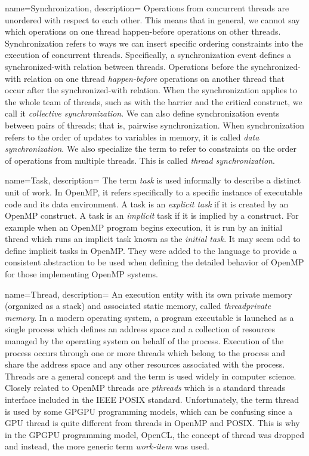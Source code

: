 {
   name={Synchronization},
   description={
   Operations from concurrent threads are unordered with respect to each other.  This means
   that in general, we cannot say which operations on one thread happen-before operations on 
   other threads.    Synchronization refers to ways we can insert specific ordering constraints
   into the execution of concurrent threads.  Specifically,
   a synchronization event defines a synchronized-with relation between threads.  Operations before the
   synchronized-with relation on one thread \emph{happen-before} operations on another thread that occur
   after the synchronized-with relation. When the synchronization applies to the whole team of threads, such as with 
   the barrier and the critical construct, we call it \emph{collective synchronization}.  We can also 
   define synchronization events between pairs of threads; that is, pairwise synchronization.  When synchronization
    refers to the order of updates to variables in memory, it is called \emph{data synchronization}.
   We also specialize the term to refer to constraints on the order of operations from multiple threads.  This is
   called \emph{thread synchronization}.   
}
}   


{
   name={Task},
   description={
   The term \emph{task} is used informally to describe a distinct unit of work.  In OpenMP, it refers 
   specifically to a specific instance of executable code and its data environment.  A task is an
   \emph{explicit task} if it is created by an OpenMP  construct.  A task is an \emph{implicit}
   task if it is implied by a construct.  For example when an OpenMP program begins execution, it is run
   by an initial thread which runs an implicit task known as the \emph{initial task}.   It may seem odd to 
   define implicit tasks in OpenMP.  They were added to the language to provide a consistent abstraction
   to be used when defining the detailed behavior of OpenMP for those implementing OpenMP systems.
   }
}   

{
   name={Thread},
   description={ 
An execution entity with its own private memory (organized as a stack) and associated static 
memory, called \emph{threadprivate memory}.  In a modern operating system, a program
executable is launched as a single process which defines an address space and a 
collection of resources managed by the operating system on behalf of the process.
Execution of the process occurs through one or more threads which belong to the
process and share the address space and any other resources associated with the process.
Threads are a general concept and the term is used widely in computer science.  Closely related
to OpenMP threads are \emph{pthreads} which is a standard threads interface 
included in the IEEE POSIX standard.   Unfortunately, the term thread is used by some GPGPU
programming models, which can be confusing since a GPU thread is quite different from
threads in OpenMP and POSIX.  This is why in the GPGPU programming model, OpenCL, the
concept of thread was dropped and instead, the more generic term \emph{work-item} was used.
}
}

